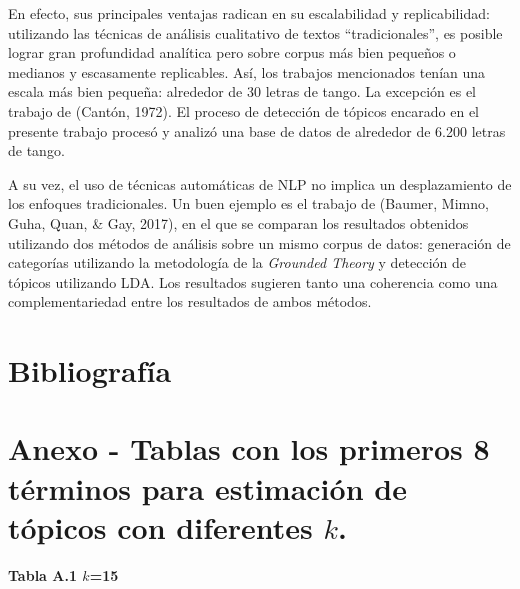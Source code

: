 \documentclass[]{article}
\begin{document}
En efecto, sus principales ventajas radican en su escalabilidad y
replicabilidad: utilizando las técnicas de análisis cualitativo de
textos ``tradicionales'', es posible lograr gran profundidad analítica
pero sobre corpus más bien pequeños o medianos y escasamente
replicables. Así, los trabajos mencionados tenían una escala más bien
pequeña: alrededor de 30 letras de tango. La excepción es el trabajo de
(Cantón, 1972). El proceso de detección de tópicos encarado en el
presente trabajo procesó y analizó una base de datos de alrededor de
6.200 letras de tango.

A su vez, el uso de técnicas automáticas de NLP no implica un
desplazamiento de los enfoques tradicionales. Un buen ejemplo es el
trabajo de (Baumer, Mimno, Guha, Quan, \& Gay, 2017), en el que se
comparan los resultados obtenidos utilizando dos métodos de análisis
sobre un mismo corpus de datos: generación de categorías utilizando la
metodología de la \emph{Grounded Theory} y detección de tópicos
utilizando LDA. Los resultados sugieren tanto una coherencia como una
complementariedad entre los resultados de ambos métodos.

\section{Bibliografía}\label{bibliografuxeda}

\section{\texorpdfstring{Anexo - Tablas con los primeros 8 términos para
estimación de tópicos con diferentes
\(k\).}{Anexo - Tablas con los primeros 8 términos para estimación de tópicos con diferentes k.}}\label{anexo---tablas-con-los-primeros-8-tuxe9rminos-para-estimaciuxf3n-de-tuxf3picos-con-diferentes-k.}

\textbf{Tabla A.1 \(k\)=15}
\end{document}
